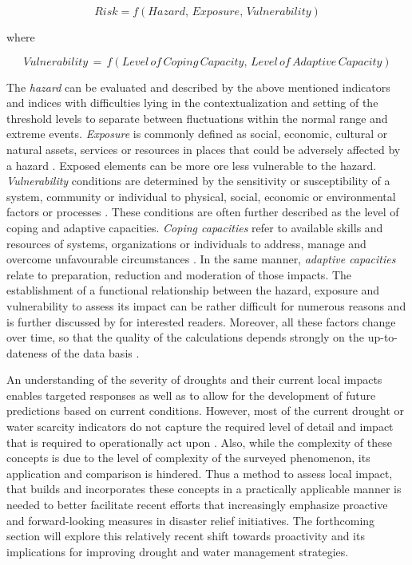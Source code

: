         \[Risk = f(Hazard,\, Exposure,\, Vulnerability)\]

    where

        \[Vulnerability\, =\, f(Level\, of\, Coping\, Capacity,\, Level\, of\, Adaptive\, Capacity)\]
\hfill {\footnotesize \autocite{boultDroughtImpactbasedForecasting2022,harrowsmithFutureForecastImpact2020,undrrSpecialReportDrought2021}}

The \textit{hazard} can be evaluated and described by the above mentioned indicators and indices with difficulties lying in the contextualization and setting of the threshold levels to separate between fluctuations within the normal range and extreme events. \textit{Exposure} is commonly defined as social, economic, cultural or natural assets, services or resources in places that could be adversely affected by a hazard \autocite{ipccClimateChange20142014}. Exposed elements can be more ore less vulnerable to the hazard. \textit{Vulnerability} conditions are determined by the sensitivity or susceptibility of a system, community or individual to physical, social, economic or environmental factors or processes \autocite{ipccClimateChange20142014}. These conditions are often further described as the level of coping and adaptive capacities. \textit{Coping capacities} refer to available skills and resources of systems, organizations or individuals to address, manage and overcome unfavourable circumstances \autocite{ipccGlossaryTerms2012}. In the same manner, \textit{adaptive capacities} relate to preparation, reduction and moderation of those impacts.\newline
The establishment of a functional relationship between the hazard, exposure and vulnerability to assess its impact can be rather difficult for numerous reasons and is further discussed by \textcite{boultDroughtImpactbasedForecasting2022} for interested readers. Moreover, all these factors change over time, so that the quality of the calculations depends strongly on the up-to-dateness of the data basis \autocite{harrowsmithFutureForecastImpact2020}.

An understanding of the severity of droughts and their current local impacts enables targeted responses as well as to allow for the development of future predictions based on current conditions. However, most of the current drought or water scarcity indicators do not capture the required level of detail and impact that is required to operationally act upon \autocite{bartramGlobalMonitoringWater2014,mishraWaterSecurityChanging2021}. Also, while the complexity of these concepts is due to the level of complexity of the surveyed phenomenon, its application and comparison is hindered. Thus a method to assess local impact, that builds and incorporates these concepts in a practically applicable manner is needed to better facilitate recent efforts that increasingly emphasize proactive and forward-looking measures in disaster relief initiatives. The forthcoming section will explore this relatively recent shift towards proactivity and its implications for improving drought and water management strategies.


